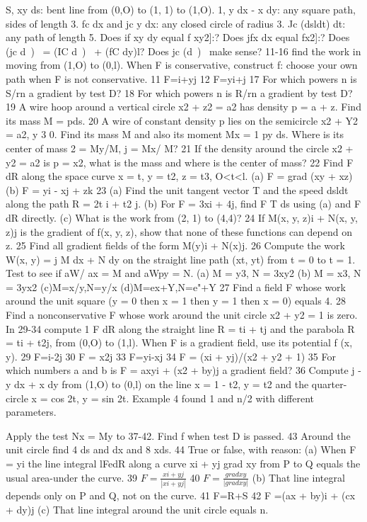 S, xy ds: bent line from (0,O) to (1, 1) to (1,O).
1, y dx - x dy: any square path, sides of length 3.
fc dx and jc y dx: any closed circle of radius 3.
Jc (dsldt) dt: any path of length 5.
Does if xy dy equal f xy2]:?
Does jfx dx equal fx2]:?
Does (jc d~)~ = (IC d~)~ + (fC dy)l?
Does jc (d~)~ make sense?
11-16 find the work in moving from (1,O) to (0,l). When F
is conservative, construct f: choose your own path when F is
not conservative.
11 F=i+yj 12 F=yi+j
17 For which powers n is S/rn a gradient by test D?
18 For which powers n is R/rn a gradient by test D?
19 A wire hoop around a vertical circle x2 + z2 = a2 has
density p = a + z. Find its mass M = pds.
20 A wire of constant density p lies on the semicircle
x2 + Y2 = a2, y 3 0. Find its mass M and also its moment
Mx = 1 py ds. Where is its center of mass 2 = My/M, j = Mx/
M?
21 If the density around the circle x2 + y2 = a2 is p = x2, what
is the mass and where is the center of mass?
22 Find F dR along the space curve x = t, y = t2, z = t3,
O<t<l.
(a) F = grad (xy + xz) (b) F = yi - xj + zk
23 (a) Find the unit tangent vector T and the speed dsldt
along the path R = 2t i + t2 j.
(b) For F = 3xi + 4j, find F T ds using (a) and F dR
directly.
(c) What is the work from (2, 1) to (4,4)?
24 If M(x, y, z)i + N(x, y, z)j is the gradient of f(x, y, z), show
that none of these functions can depend on z.
25 Find all gradient fields of the form M(y)i + N(x)j.
26 Compute the work W(x, y) = j M dx + N dy on the
straight line path (xt, yt) from t = 0 to t = 1. Test to see if aW/
ax = M and aWpy = N.
(a) M = y3, N = 3xy2 (b) M = x3, N = 3yx2
(c)M=x/y,N=y/x (d)M=ex+Y,N=e"+Y
27 Find a field F whose work around the unit square (y = 0
then x = 1 then y = 1 then x = 0) equals 4.
28 Find a nonconservative F whose work around the unit
circle x2 + y2 = 1 is zero.
In 29-34 compute 1 F dR along the straight line R = ti + tj
and the parabola R = ti + t2j, from (0,O) to (1,l). When F is a
gradient field, use its potential f (x, y).
29 F=i-2j 30 F = x2j
33 F=yi-xj 34 F = (xi + yj)/(x2 + y2 + 1)
35 For which numbers a and b is F = axyi + (x2 + by)j a
gradient field?
36 Compute j - y dx + x dy from (1,O) to (0,l) on the line
x = 1 - t2, y = t2 and the quarter-circle x = cos 2t, y = sin 2t.
Example 4 found 1 and n/2 with different parameters. 

Apply the test Nx = My to 37-42. Find f when test D is passed. 43 Around the unit circle find 4 ds and  dx and 8 xds.
44 True or false, with reason:
(a) When F = yi the line integral lFedR along a curve
xi + yj grad xy from P to Q equals the usual area-under the curve.
39 $F = \frac{xi+yj}{|xi+yj|}$ 40 $F = \frac{grad xy}{|grad xy|}$
(b) That line integral depends only on P and Q, not on the
curve.
41 F=R+S 42 F =(ax + by)i + (cx + dy)j (c) That line integral around the unit circle equals n. 

